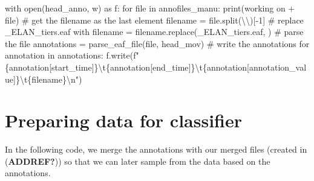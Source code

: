 \documentclass[
  letterpaper,
  DIV=11,
  numbers=noendperiod]{scrreprt}
\newenvironment{Shaded}{\begin{snugshade}}{\end{snugshade}}
\newcommand{\BuiltInTok}[1]{\textcolor[rgb]{0.00,0.23,0.31}{#1}}
\newcommand{\CharTok}[1]{\textcolor[rgb]{0.13,0.47,0.30}{#1}}
\newcommand{\CommentTok}[1]{\textcolor[rgb]{0.37,0.37,0.37}{#1}}
\newcommand{\ControlFlowTok}[1]{\textcolor[rgb]{0.00,0.23,0.31}{#1}}
\newcommand{\DecValTok}[1]{\textcolor[rgb]{0.68,0.00,0.00}{#1}}
\newcommand{\ImportTok}[1]{\textcolor[rgb]{0.00,0.46,0.62}{#1}}
\newcommand{\KeywordTok}[1]{\textcolor[rgb]{0.00,0.23,0.31}{#1}}
\newcommand{\NormalTok}[1]{\textcolor[rgb]{0.00,0.23,0.31}{#1}}
\newcommand{\OperatorTok}[1]{\textcolor[rgb]{0.37,0.37,0.37}{#1}}
\newcommand{\SpecialCharTok}[1]{\textcolor[rgb]{0.37,0.37,0.37}{#1}}
\newcommand{\SpecialStringTok}[1]{\textcolor[rgb]{0.13,0.47,0.30}{#1}}
\newcommand{\StringTok}[1]{\textcolor[rgb]{0.13,0.47,0.30}{#1}}
\begin{document}
\begin{Shaded}
\begin{Highlighting}[]
\ControlFlowTok{with} \BuiltInTok{open}\NormalTok{(head\_anno, }\StringTok{\textquotesingle{}w\textquotesingle{}}\NormalTok{) }\ImportTok{as}\NormalTok{ f:}
    \ControlFlowTok{for} \BuiltInTok{file} \KeywordTok{in}\NormalTok{ annofiles\_manu:}
        \BuiltInTok{print}\NormalTok{(}\StringTok{\textquotesingle{}working on \textquotesingle{}} \OperatorTok{+} \BuiltInTok{file}\NormalTok{)}
        \CommentTok{\# get the filename as the last element}
\NormalTok{        filename }\OperatorTok{=} \BuiltInTok{file}\NormalTok{.split(}\StringTok{\textquotesingle{}}\CharTok{\textbackslash{}\textbackslash{}}\StringTok{\textquotesingle{}}\NormalTok{)[}\OperatorTok{{-}}\DecValTok{1}\NormalTok{]}
        \CommentTok{\# replace \_ELAN\_tiers.eaf with \textquotesingle{}\textquotesingle{}}
\NormalTok{        filename }\OperatorTok{=}\NormalTok{ filename.replace(}\StringTok{\textquotesingle{}\_ELAN\_tiers.eaf\textquotesingle{}}\NormalTok{, }\StringTok{\textquotesingle{}\textquotesingle{}}\NormalTok{)}
        \CommentTok{\# parse the file}
\NormalTok{        annotations }\OperatorTok{=}\NormalTok{ parse\_eaf\_file(}\BuiltInTok{file}\NormalTok{, }\StringTok{\textquotesingle{}head\_mov\textquotesingle{}}\NormalTok{)}
        \CommentTok{\# write the annotations}
        \ControlFlowTok{for}\NormalTok{ annotation }\KeywordTok{in}\NormalTok{ annotations:}
\NormalTok{            f.write(}\SpecialStringTok{f"}\SpecialCharTok{\{}\NormalTok{annotation[}\StringTok{\textquotesingle{}start\_time\textquotesingle{}}\NormalTok{]}\SpecialCharTok{\}}\CharTok{\textbackslash{}t}\SpecialCharTok{\{}\NormalTok{annotation[}\StringTok{\textquotesingle{}end\_time\textquotesingle{}}\NormalTok{]}\SpecialCharTok{\}}\CharTok{\textbackslash{}t}\SpecialCharTok{\{}\NormalTok{annotation[}\StringTok{\textquotesingle{}annotation\_value\textquotesingle{}}\NormalTok{]}\SpecialCharTok{\}}\CharTok{\textbackslash{}t}\SpecialCharTok{\{}\NormalTok{filename}\SpecialCharTok{\}}\CharTok{\textbackslash{}n}\SpecialStringTok{"}\NormalTok{)}
\end{Highlighting}
\end{Shaded}


\chapter{Preparing data for
classifier}\label{preparing-data-for-classifier}

In the following code, we merge the annotations with our merged files
(created in (\textbf{ADDREF?})) so that we can later sample from the
data based on the annotations.
\end{document}
